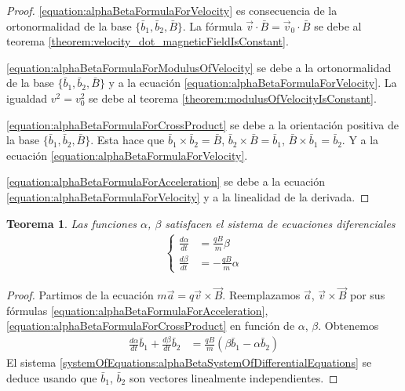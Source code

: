 \documentclass{article}
\newtheorem{theorem}{Teorema}
\begin{document}
  \begin{proof}
    \eqref{equation:alphaBetaFormulaForVelocity}
    es consecuencia de la ortonormalidad de la base \(\{\bar{b}_1, \bar{b}_2, \bar{B}\}\).
    La fórmula \(\vec{v} \cdot \bar{B} = \vec{v}_0 \cdot \bar{B}\) se debe al teorema \ref{theorem:velocity_dot_magneticFieldIsConstant}.

    \eqref{equation:alphaBetaFormulaForModulusOfVelocity}
    se debe a la ortonormalidad de la base \(\{\bar{b}_1, \bar{b}_2, \bar{B}\}\) y a la ecuación \eqref{equation:alphaBetaFormulaForVelocity}.
    La igualdad \(v^2 = v_0^2\) se debe al teorema \ref{theorem:modulusOfVelocityIsConstant}.

    \eqref{equation:alphaBetaFormulaForCrossProduct}
    se debe a la orientación positiva de la base \(\{\bar{b}_1, \bar{b}_2, \bar{B}\}\).
    Esta hace que \(\bar{b}_1 \times \bar{b}_2 = \bar{B}\), \(\bar{b}_2 \times \bar{B} = \bar{b}_1\), \(\bar{B} \times \bar{b}_1 = \bar{b}_2\).
    Y a la ecuación \eqref{equation:alphaBetaFormulaForVelocity}.

    \eqref{equation:alphaBetaFormulaForAcceleration}
    se debe a la ecuación \eqref{equation:alphaBetaFormulaForVelocity} y a la linealidad de la derivada.
  \end{proof}

  \begin{theorem}
    Las funciones \(\alpha\), \(\beta\) satisfacen el sistema de ecuaciones diferenciales
    \begin{align}
      \label{systemOfEquations:alphaBetaSystemOfDifferentialEquations}
      \left\{
        \begin{aligned}
          \frac{d \alpha}{d t} &= \frac{q B}{m} \beta
          \\
          \frac{d \beta}{d t} &= - \frac{q B}{m} \alpha
        \end{aligned}
      \right.
    \end{align}
  \end{theorem}
  \begin{proof}
    Partimos de la ecuación \(m \vec{a} = q \vec{v} \times \vec{B}\).
    Reemplazamos \(\vec{a}\), \(\vec{v} \times \vec{B}\) por sus fórmulas \eqref{equation:alphaBetaFormulaForAcceleration}, \eqref{equation:alphaBetaFormulaForCrossProduct} en función de \(\alpha\), \(\beta\).
    Obtenemos
    \begin{align}
      \frac{d \alpha}{d t} \bar{b}_1 + \frac{d \beta}{d t} \bar{b}_2
      &=
      \frac{q B}{m} (\beta \bar{b}_1 - \alpha \bar{b}_2)
    \end{align}
    El sistema \eqref{systemOfEquations:alphaBetaSystemOfDifferentialEquations} se deduce usando que \(\bar{b}_1\), \(\bar{b}_2\) son vectores linealmente independientes.
  \end{proof}
\end{document}

